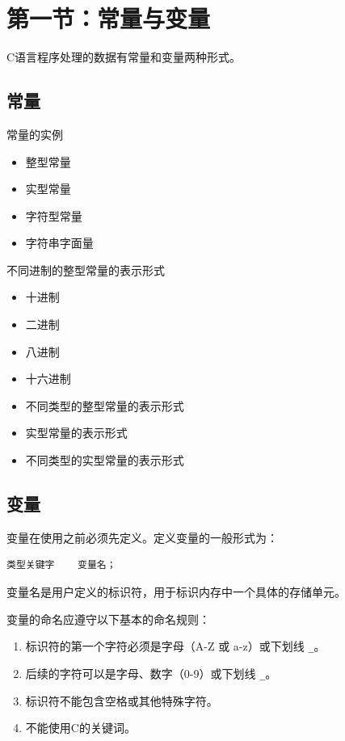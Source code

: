 

\section{第一节：常量与变量}
C语言程序处理的数据有常量和变量两种形式。

\subsection{常量}
常量的实例
\begin{itemize}
    \item 整型常量
    \item 实型常量
    \item 字符型常量
    \item 字符串字面量
\end{itemize}

不同进制的整型常量的表示形式
\begin{itemize}
    \item 十进制
    \item 二进制
    \item 八进制
    \item 十六进制
\end{itemize}

\begin{itemize}
    \item 不同类型的整型常量的表示形式
    \item 实型常量的表示形式
    \item 不同类型的实型常量的表示形式
\end{itemize}

\subsection{变量}
变量在使用之前必须先定义。定义变量的一般形式为：
\begin{verbatim}
类型关键字    变量名；
\end{verbatim}

变量名是用户定义的标识符，用于标识内存中一个具体的存储单元。

变量的命名应遵守以下基本的命名规则：
\begin{enumerate}
    \item 标识符的第一个字符必须是字母（A-Z 或 a-z）或下划线 \texttt{\_}。
    \item 后续的字符可以是字母、数字（0-9）或下划线 \texttt{\_}。
    \item 标识符不能包含空格或其他特殊字符。
    \item 不能使用C的关键词。
\end{enumerate}

